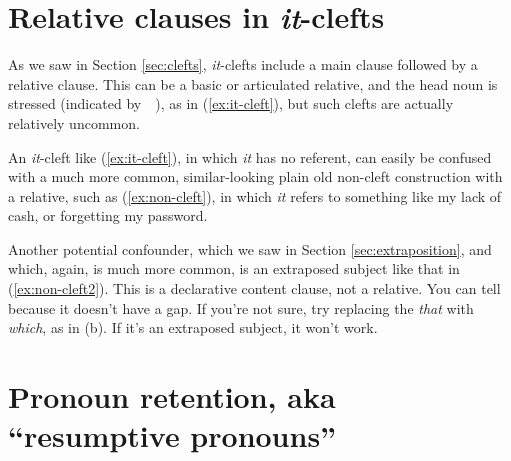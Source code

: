 \section{Relative clauses in \textit{it}-clefts}

As we saw in Section \ref{sec:clefts}, \textit{it}-clefts include a main clause followed by a relative clause. This can be a basic or articulated relative, and the head noun is stressed (indicated by~~), as in (\ref{ex:it-cleft}), but such clefts are actually relatively uncommon.

\ea \label{ex:it-cleft}
    \z
\z

An \textit{it}-cleft like (\ref{ex:it-cleft}), in which \textit{it} has no referent, can easily be confused with a much more common, similar-looking plain old non-cleft construction with a relative, such as (\ref{ex:non-cleft}), in which \textit{it} refers to something like my lack of cash, or forgetting my password. 

\begin{samepage}
    \ea \label{ex:non-cleft}
        \z
    \z
\end{samepage}

Another potential confounder, which we saw in Section \ref{sec:extraposition}, and which, again, is much more common, is an extraposed subject like that in (\ref{ex:non-cleft2}). This is a declarative content clause, not a relative. You can tell because it doesn't have a gap. If you're not sure, try replacing the \textit{that} with \textit{which}, as in (b). If it's an extraposed subject, it won't work.

\ea \label{ex:non-cleft2}
    \z
\z

\section{Pronoun retention, aka ``resumptive pronouns''}

